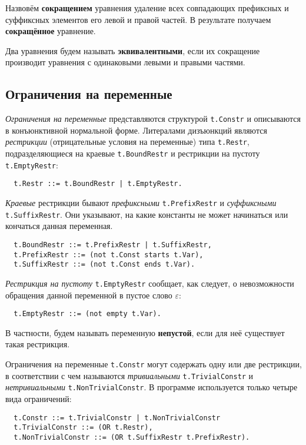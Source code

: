\documentclass[12pt]{article}
\begin{document}
Назвовём \textbf{сокращением} уравнения удаление всех совпадающих префиксных
и суффиксных элементов его левой и правой частей. В результате получаем
\textbf{сокращённое} уравнение.

Два уравнения будем называть \textbf{эквивалентными}, если их сокращение
производит уравнения с одинаковыми левыми и правыми частями.

\subsection{Ограничения на переменные}

\textit{Ограничения на переменные} представляются структурой \texttt{t.Constr}
и описываются в конъюнктивной нормальной форме. Литералами дизъюнкций являются
\textit{рестрикции} (отрицательные условия на переменные) типа \texttt{t.Restr},
подразделяющиеся на краевые \texttt{t.BoundRestr} и рестрикции на пустоту
\texttt{t.EmptyRestr}:
\begin{Verbatim}
  t.Restr ::= t.BoundRestr | t.EmptyRestr.
\end{Verbatim}

\textit{Краевые} рестрикции бывают \textit{префиксными} \texttt{t.PrefixRestr} и
\textit{суффиксными} \texttt{t.SuffixRestr}. Они указывают, на какие константы
не может начинаться или кончаться данная переменная.
\begin{Verbatim}
  t.BoundRestr ::= t.PrefixRestr | t.SuffixRestr,
  t.PrefixRestr ::= (not t.Const starts t.Var),
  t.SuffixRestr ::= (not t.Const ends t.Var).
\end{Verbatim}

\textit{Рестрикция на пустоту} \texttt{t.EmptyRestr} сообщает, как следует, о
невозможности обращения данной переменной в пустое слово $\varepsilon$:
\begin{Verbatim}
  t.EmptyRestr ::= (not empty t.Var).
\end{Verbatim}

В частности, будем называть переменную \textbf{непустой}, если для неё
существует такая рестрикция.

Ограничения на переменные \texttt{t.Constr} могут содержать одну или две
рестрикции, в соответствии с чем называются \textit{тривиальными}
\texttt{t.TrivialConstr} и \textit{нетривиальными} \texttt{t.NonTrivialConstr}.
В программе используется только четыре вида ограничений:
\begin{Verbatim}
  t.Constr ::= t.TrivialConstr | t.NonTrivialConstr
  t.TrivialConstr ::= (OR t.Restr),
  t.NonTrivialConstr ::= (OR t.SuffixRestr t.PrefixRestr).
\end{Verbatim}
\end{document}
